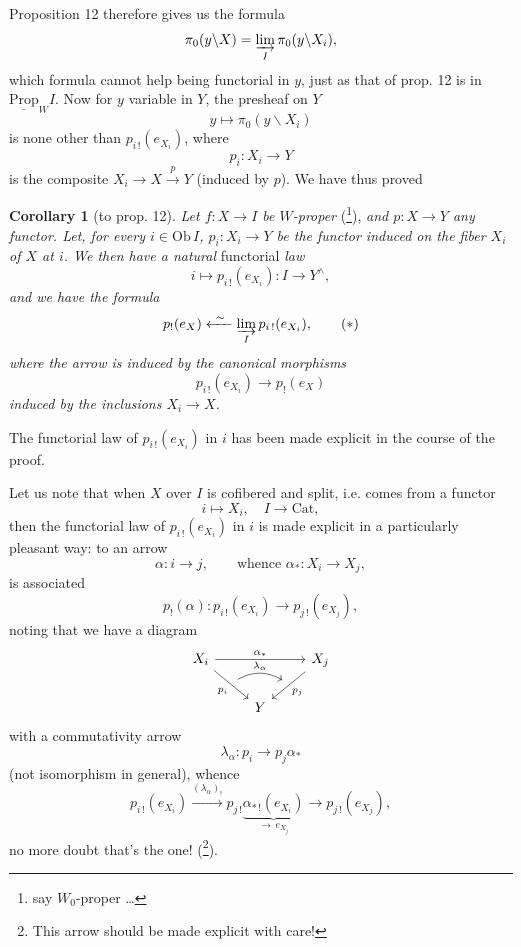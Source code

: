 Proposition 12 therefore gives us the formula
\[
\pi_0(y\backslash X) = \varinjlim_{I} \pi_0(y\backslash X_i),
\]
which formula cannot help being functorial in $y$, just as that of prop. 12 is in $\underline{\mathrm{Prop}}_W I$. Now for $y$ variable in $Y$, the presheaf on $Y$
\[
y \longmapsto \pi_0(y\backslash X_i)
\]
is none other than $p_{i\,!}(e_{X_i})$, where
\[
p_i : X_i \longrightarrow Y
\]
is the composite $X_i \longrightarrow X \xrightarrow{p} Y$ (induced by $p$). We have thus proved

\textbf{Corollary 1} (to prop. 12). \textit{Let $f : X \longrightarrow I$ be $W$-proper} (\footnote[82]{say $W_0$-proper \dots}), \textit{and $p : X \longrightarrow Y$ any functor. Let, for every $i \in \mathrm{Ob}\, I$, $p_i : X_i \longrightarrow Y$ be the functor induced on the fiber $X_i$ of $X$ at $i$. We then have a natural} functorial \textit{law}
\[
i \longmapsto p_{i\,!}(e_{X_i}) : I \longrightarrow Y^\wedge,
\]
\textit{and we have the formula}
\[
p_!(e_X) \xleftarrow{\ \sim\ } \varinjlim_{I} p_{i\,!}(e_{X_i}), \tag*{$(*)$}
\]
\textit{where the arrow is induced by the canonical morphisms}
\[
p_{i\,!}(e_{X_i}) \longrightarrow p_!(e_X)
\]
\textit{induced by the inclusions $X_i \longrightarrow X$.}

The functorial law of $p_{i\,!}(e_{X_i})$ in $i$ has been made explicit in the course of the proof.

Let us note that when $X$ over $I$ is cofibered and split, i.e. comes from a functor
\[
i \longmapsto X_i, \quad I \longrightarrow \mathrm{Cat},
\]
then the functorial law of $p_{i\,!}(e_{X_i})$ in $i$ is made explicit in a particularly pleasant way: to an arrow
\[
\alpha : i \longrightarrow j, \qquad \text{whence } \alpha_* : X_i \longrightarrow X_j,
\]
is associated
\[
p_!(\alpha) : p_{i\,!}(e_{X_i}) \longrightarrow p_{j\,!}(e_{X_j}),
\]
noting that we have a diagram
\[
\begin{tikzcd}
X_i \arrow[rr, "\alpha_*"] \arrow[dr, "p_i"', ""{name=A}] & & X_j \arrow[dl, "p_j", ""'{name=B}] \\
& Y &
\arrow[from=A, to=B, bend left, "\lambda_\alpha"] %
\end{tikzcd}
\]
with a commutativity arrow
\[
\lambda_\alpha : p_i \longrightarrow p_j\alpha_*
\]
(not isomorphism in general), whence
\[
p_{i\,!}(e_{X_i}) \xrightarrow{(\lambda_\alpha)_!} p_{j\,!}\underbrace{\alpha_{*\,!}(e_{X_i})}_{\longrightarrow\, e_{X_j}} \longrightarrow p_{j\,!}(e_{X_j}),
\]
no more doubt that's the one! (\footnote[83]{This arrow should be made explicit with care!}).

